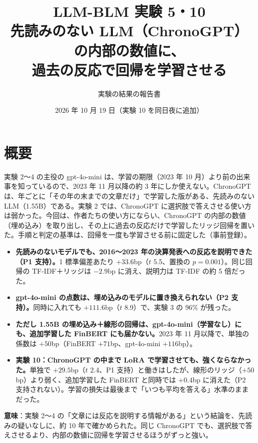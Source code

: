 \documentclass[xelatex,ja=standard,jafont=haranoaji,a4paper,10pt,openany]{bxjsreport}
\title{LLM-BLM 実験 5・10\\[6pt]
  \large 先読みのない LLM（ChronoGPT）の内部の数値に、\\過去の反応で回帰を学習させる}
\author{実験の結果の報告書}
\date{2026 年 10 月 19 日（実験 10 を同日夜に追加）}
\begin{document}
\maketitle

\chapter*{概要}

実験 2〜4 の主役の gpt-4o-mini は、学習の期限（2023 年 10 月）より前の出来事を知っているので、2023 年 11 月以降の約 3 年にしか使えない。ChronoGPT は、年ごとに「その年の末までの文章だけ」で学習した版がある、先読みのない LLM（1.55B）である。実験 2 では、ChronoGPT に選択肢で答えさせる使い方は弱かった。今回は、作者たちの使い方にならい、ChronoGPT の内部の数値（埋め込み）を取り出し、その上に過去の反応だけで学習したリッジ回帰を置いた。手順と判定の基準は、回帰を一度も学習させる前に固定した（事前登録）。

\begin{keybox}[主な結論]
\begin{itemize}
\item \textbf{先読みのないモデルでも、2016〜2023 年の決算発表への反応を説明できた（P1 支持）。}1 標準偏差あたり $+33.6$bp（$t$ 5.5、置換の $p=0.001$）。同じ回帰の TF-IDF＋リッジは $-2.9$bp に消え、説明力は TF-IDF の約 5 倍だった。
\item \textbf{gpt-4o-mini の点数は、埋め込みのモデルに置き換えられない（P2 支持）。}同時に入れても $+111.6$bp（$t$ 8.9）で、実験 3 の 96\% が残った。
\item \textbf{ただし 1.55B の埋め込み＋線形の回帰は、gpt-4o-mini（学習なし）にも、追加学習した FinBERT にも届かない。}2023 年 11 月以降で、単独の係数は $+50$bp（FinBERT $+71$bp、gpt-4o-mini $+116$bp）。
\item \textbf{実験 10：ChronoGPT の中まで LoRA で学習させても、強くならなかった。}単独で $+29.5$bp（$t$ 2.4、P1 支持）と働きはしたが、線形のリッジ（$+50$bp）より弱く、追加学習した FinBERT と同時では $+0.4$bp に消えた（P2 支持されない）。学習の損失は最後まで「いつも平均を答える」水準のままだった。
\end{itemize}
\end{keybox}

\textbf{意味}：実験 2〜4 の「文章には反応を説明する情報がある」という結論を、先読みの疑いなしに、約 10 年で確かめられた。同じ ChronoGPT でも、選択肢で答えさせるより、内部の数値に回帰を学習させるほうがずっと強い。
\end{document}
